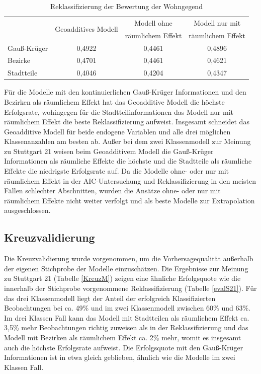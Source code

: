 \documentclass{Vorlage}
\begin{document}
\begin{table}[h]
\centering
\caption{Reklassifizierung der Bewertung der Wohngegend}
\label{evalB}
\begin{tabular}{l|c|c|c}
\hline \hline
             & \multirow{2}{*}{Geoadditives Modell} & Modell ohne       & Modell nur mit    \\
             &                                      & räumlichem Effekt & räumlichem Effekt \\ \hline
Gauß-Krüger & 0,4922                               & 0,4461            & 0,4896            \\
Bezirke      & 0,4701                               & 0,4461            & 0,4621            \\
Stadtteile   & 0,4046                               & 0,4204            & 0,4347            \\ \hline \hline
\end{tabular}
\end{table}

Für die Modelle mit den kontinuierlichen Gauß-Krüger Informationen und den Bezirken als räumlichem Effekt hat das Geoadditive Modell die höchste Erfolgsrate, wohingegen für die Stadtteilinformationen das Modell nur mit räumlichem Effekt die beste Reklassifizierung aufweist. Insgesamt schneidet das Geoadditive Modell für beide endogene Variablen und alle drei möglichen Klassenanzahlen am besten ab. Außer bei dem zwei Klassenmodell zur Meinung zu Stuttgart 21 weisen beim Geoadditivem Modell die Gauß-Krüger Informationen als räumliche Effekte die höchste und die Stadtteile als räumliche Effekte die niedrigste Erfolgsrate auf. Da die Modelle ohne- oder nur mit räumlichem Effekt in der AIC-Untersuchung und Reklassifizierung in den meisten Fällen schlechter Abschnitten, wurden die Ansätze ohne- oder nur mit räumlichem Effekte nicht weiter verfolgt und als beste Modelle zur Extrapolation ausgeschlossen.

\subsection{Kreuzvalidierung}

Die Kreuzvalidierung wurde vorgenommen, um die Vorhersagequalität außerhalb der eigenen Stichprobe der Modelle einzuschätzen. Die Ergebnisse zur Meinung zu Stuttgart 21 (Tabelle \ref{KreuzM}) zeigen eine ähnliche Erfolgsquote wie die innerhalb der Stichprobe vorgenommene Reklassifizierung (Tabelle \ref{evalS21}). Für das drei Klassenmodell liegt der Anteil der erfolgreich Klassifizierten Beobachtungen bei ca. 49\% und im zwei Klassenmodell zwischen 60\% und 63\%. Im drei Klassen Fall kann das Modell mit Stadtteilen als räumlichem Effekt ca. 3,5\%  mehr Beobachtungen richtig zuweisen als in der Reklassifizierung und das Modell mit Bezirken als räumlichem Effekt ca. 2\% mehr, womit es insgesamt auch die höchste Erfolgsrate aufweist. Die Erfolgsquote mit den Gauß-Krüger Informationen ist in etwa gleich geblieben, ähnlich wie die Modelle im zwei Klassen Fall.
 
\end{document}
